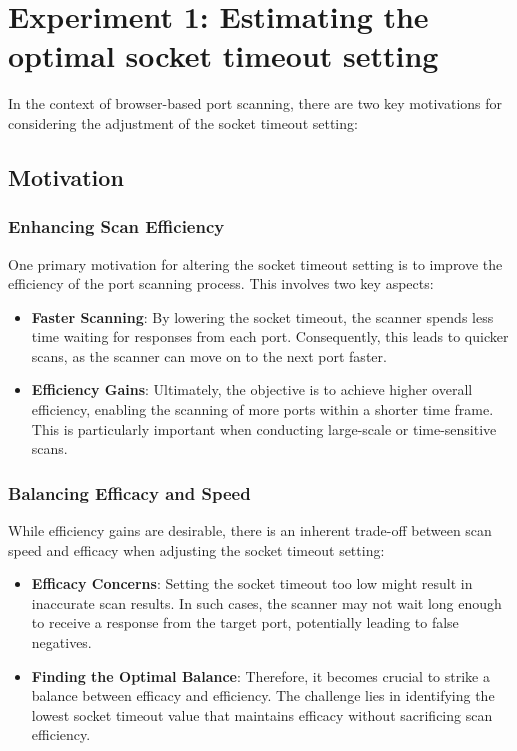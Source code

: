 \section{Experiment 1: Estimating the optimal socket timeout setting}
\label{section:socket-timeout-setting}

In the context of browser-based port scanning, there are two key motivations for considering the adjustment of the socket timeout setting:
\subsection{Motivation}
\subsubsection{Enhancing Scan Efficiency}

One primary motivation for altering the socket timeout setting is to improve the efficiency of the port scanning process. This involves two key aspects:

\begin{itemize}
  \item \textbf{Faster Scanning}: By lowering the socket timeout, the scanner spends less time waiting for responses from each port. Consequently, this leads to quicker scans, as the scanner can move on to the next port faster.

  \item \textbf{Efficiency Gains}: Ultimately, the objective is to achieve higher overall efficiency, enabling the scanning of more ports within a shorter time frame. This is particularly important when conducting large-scale or time-sensitive scans.
\end{itemize}

\subsubsection{Balancing Efficacy and Speed}

While efficiency gains are desirable, there is an inherent trade-off between scan speed and efficacy when adjusting the socket timeout setting:

\begin{itemize}
  \item \textbf{Efficacy Concerns}: Setting the socket timeout too low might result in inaccurate scan results. In such cases, the scanner may not wait long enough to receive a response from the target port, potentially leading to false negatives.

  \item \textbf{Finding the Optimal Balance}: Therefore, it becomes crucial to strike a balance between efficacy and efficiency. The challenge lies in identifying the lowest socket timeout value that maintains efficacy without sacrificing scan efficiency.
\end{itemize}

